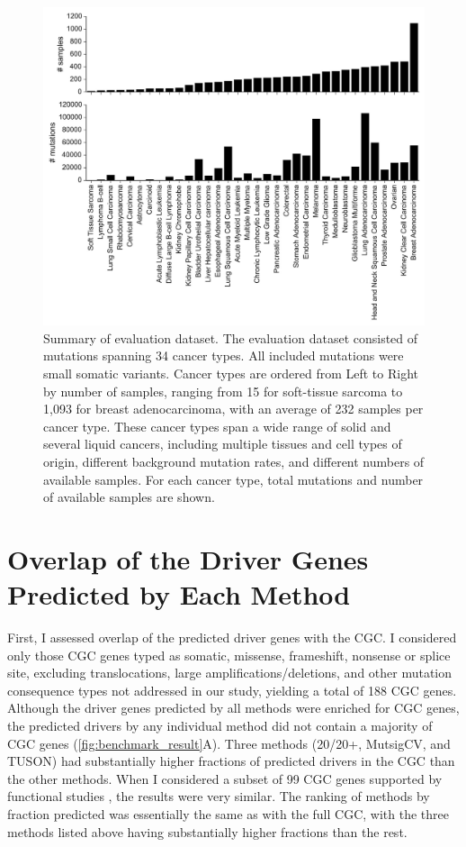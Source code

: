 \begin{figure}
  \centering
  \makeatletter
  \let\@currsize\normalsize
  \includegraphics[width=0.9\linewidth]{figures/chapter4/study_size.jpg}
  \caption[Summary of evaluation dataset.]{Summary of evaluation dataset. The evaluation dataset consisted of mutations spanning 34 cancer types. All included mutations were small somatic variants. Cancer types are ordered from Left to Right by number of samples, ranging from 15 for soft-tissue sarcoma to 1,093 for breast adenocarcinoma, with an average of 232 samples per cancer type. These cancer types span a wide range of solid and several liquid cancers, including multiple tissues and cell types of origin, different background mutation rates, and different numbers of available samples. For each cancer type, total mutations and number of available samples are shown.}
  \label{fig:benchmark_data}
\end{figure}

\section{Overlap of the Driver Genes Predicted by Each Method}

First, I assessed overlap of the predicted driver genes with the CGC. I considered only those CGC genes typed as somatic, missense, frameshift, nonsense or splice site, excluding translocations, large amplifications/deletions, and other mutation consequence types not addressed in our study, yielding a total of 188 CGC genes. Although the driver genes predicted by all methods were enriched for CGC genes, the predicted drivers by any individual method did not contain a majority of CGC genes (\autoref{fig:benchmark_result}A). Three methods (20/20+, MutsigCV, and TUSON) had substantially higher fractions of predicted drivers in the CGC than the other methods. When I considered a subset of 99 CGC genes supported by functional studies \cite{RN99}, the results were very similar. The ranking of methods by fraction predicted was essentially the same as with the full CGC, with the three methods listed above having substantially higher fractions than the rest.

